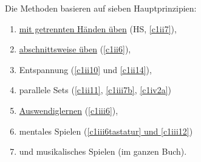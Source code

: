 Die Methoden basieren auf sieben Hauptprinzipien:

\begin{enumerate}[label={\arabic*.}] 
 \item \hyperref[c1ii7]{mit getrennten Händen üben} (HS, \autoref{c1ii7}),
 \item \hyperref[c1ii6]{abschnittsweise üben} (\autoref{c1ii6}),
 \item Entspannung (\hyperref[c1ii10]{\autoref{c1ii10}} und \hyperref[c1ii14]{\autoref{c1ii14}}),
 \item parallele Sets (\hyperref[c1ii11]{\autoref{c1ii11}}, \hyperref[c1iii7b]{\autoref{c1iii7b}}, \hyperref[c1iv2a]{\autoref{c1iv2a}})
 \item \hyperref[c1iii6]{Auswendiglernen} (\autoref{c1iii6}),
 \item mentales Spielen (\hyperref[c1iii6tastatur]{\autoref{c1iii6tastatur} und \hyperref[c1iii12]{\autoref{c1iii12}}})
 \item und musikalisches Spielen (im ganzen Buch).
\end{enumerate}

